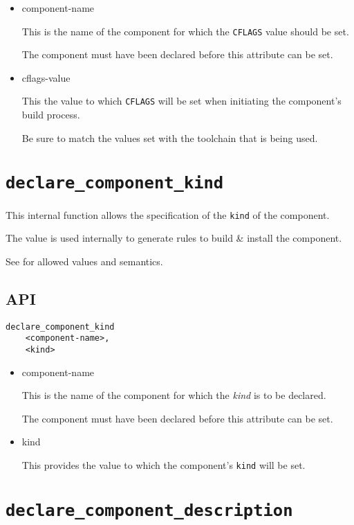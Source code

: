 \begin{itemize}
\item component-name

  This is the name of the component for which the \texttt{CFLAGS}
  value should be set.

  The component must have been declared before this attribute can be
  set.

\item cflags-value

  This the value to which \texttt{CFLAGS} will be set when initiating
  the component's build process.

  Be sure to match the values set with the toolchain that is being
  used.

\end{itemize}

\section{\texttt{declare\_component\_kind}}\label{api:kind}

This internal function allows the specification of the \texttt{kind}
of the component.

The value is used internally to generate \make rules to build \&
install the component.

See  for allowed values and semantics.

\subsection{API}

\begin{verbatim}
declare_component_kind
    <component-name>,
    <kind>
\end{verbatim}

\begin{itemize}
\item component-name

  This is the name of the component for which the \emph{kind} is to be declared.

  The component must have been declared before this attribute can be
  set.

\item kind

  This provides the value to which the component's \texttt{kind} will
  be set.
\end{itemize}

\section{\texttt{declare\_component\_description}}\label{api:description}

